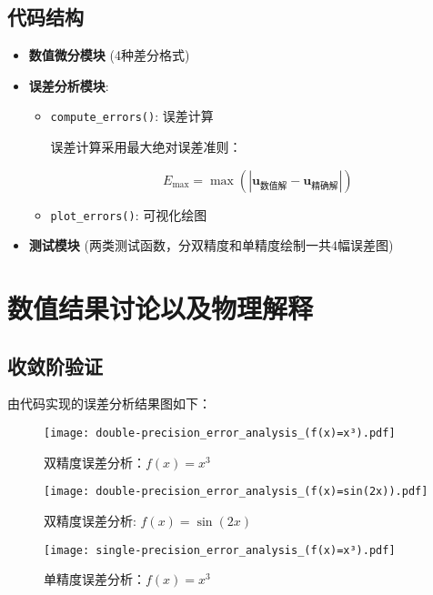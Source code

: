 \documentclass[12pt,a4paper]{article}
\begin{document}
\subsection{代码结构}
\begin{itemize}
    \item \textbf{数值微分模块} (4种差分格式)
    \item \textbf{误差分析模块}:
    \begin{itemize}
        \item \texttt{compute\_errors()}: 误差计算

        误差计算采用最大绝对误差准则：

        \[E_{\text{max}} = \max\left(\left|\mathbf{u}_{\text{数值解}} - \mathbf{u}_{\text{精确解}}\right|\right)\]

        \item \texttt{plot\_errors()}: 可视化绘图
    \end{itemize}
    \item \textbf{测试模块} (两类测试函数，分双精度和单精度绘制一共4幅误差图)
\end{itemize}

\section{数值结果讨论以及物理解释}

\subsection{收敛阶验证}

由代码实现的误差分析结果图如下：
\newpage

\begin{figure}[!htbp]
    \centering
    \texttt{[image: double-precision\_error\_analysis\_(f(x)=x³).pdf]}
    \caption{双精度误差分析：$f(x) = x^3$}
\end{figure}

\begin{figure}[!htbp]
    \centering
    \texttt{[image: double-precision\_error\_analysis\_(f(x)=sin(2x)).pdf]}
    \caption{双精度误差分析: $f(x) = \sin(2x)$}
\end{figure}
\newpage

\begin{figure}[!htbp]
    \centering
    \texttt{[image: single-precision\_error\_analysis\_(f(x)=x³).pdf]}
    \caption{单精度误差分析：$f(x) = x^3$}
\end{figure}
\end{document}
